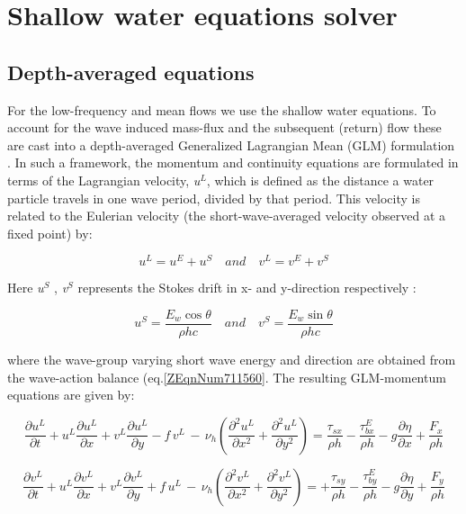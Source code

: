 \section{ Shallow water equations solver}
\subsection{ Depth-averaged equations}

For the low-frequency and mean flows we use the shallow water equations. To account for the wave induced mass-flux and the subsequent (return) flow these are cast into a depth-averaged Generalized Lagrangian Mean (GLM) formulation \citep{AndrewsMcIntyre1978, Walstra2000}. In such a framework, the momentum and continuity equations are formulated in terms of the Lagrangian velocity, \textit{u${}^{L}$}, which is defined as the distance a water particle travels in one wave period, divided by that period. This velocity is related to the Eulerian velocity (the short-wave-averaged velocity observed at a fixed point) by:

\begin{equation} \label{2.40)} 
u^{L} =u^{E} +u^{S} \quad and\quad v^{L} =v^{E} +v^{S}  
\end{equation} 

Here \textit{u${}^{S}$} ,\textit{ v${}^{S}$} represents the Stokes drift in x- and y-direction respectively \citep{Phillips1977}:

\begin{equation} \label{2.41)} 
u^{S} =\frac{E_{w} \cos \theta }{\rho hc} \quad and\quad v^{S} =\frac{E_{w} \sin \theta }{\rho hc}  
\end{equation} 

where the wave-group varying short wave energy and direction are obtained from the wave-action balance (eq.\eqref{ZEqnNum711560}. The resulting GLM-momentum equations are given by:  

\begin{equation} \label{2.42)} 
\frac{\partial u^{L} }{\partial t} +u^{L} \frac{\partial u^{L} }{\partial x} +v^{L} \frac{\partial u^{L} }{\partial y} -f\, v^{L} \, -\, \nu _{h} \left(\frac{\partial ^{2} u^{L} }{\partial x^{2} } +\frac{\partial ^{2} u^{L} }{\partial y^{2} } \right)=\frac{\tau _{sx} }{\rho h} -\frac{\tau _{bx}^{E} }{\rho h} -g\frac{\partial \eta }{\partial x} +\frac{F_{x} }{\rho h}  
\end{equation} 

\begin{equation} \label{2.43)} 
\frac{\partial v^{L} }{\partial t} +u^{L} \frac{\partial v^{L} }{\partial x} +v^{L} \frac{\partial v^{L} }{\partial y} +f\, u^{L} \, -\, \nu _{h} \left(\frac{\partial ^{2} v^{L} }{\partial x^{2} } +\frac{\partial ^{2} v^{L} }{\partial y^{2} } \right)=+\frac{\tau _{sy} }{\rho h} -\frac{\tau _{by}^{E} }{\rho h} -g\frac{\partial \eta }{\partial y} +\frac{F_{y} }{\rho h}  
\end{equation} 

